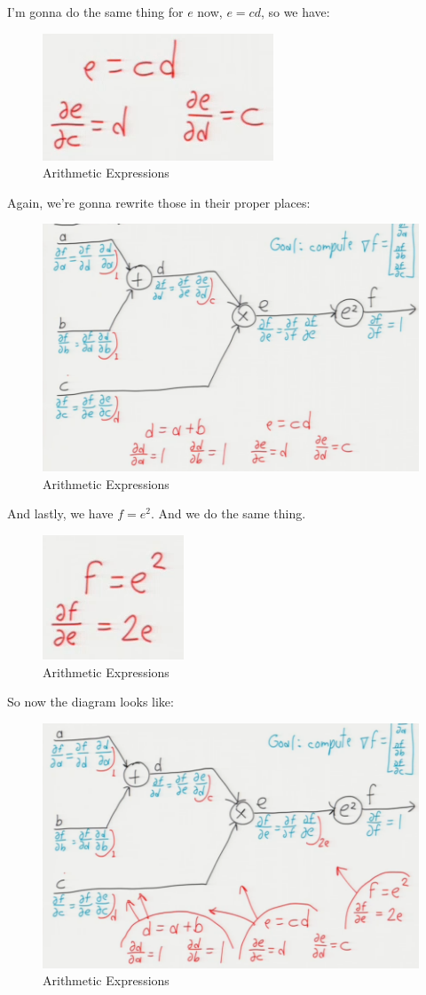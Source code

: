 \documentclass[fleqn,10pt]{olplainarticle}
\theoremstyle{definition}
\theoremstyle{remark}
\begin{document}
I'm gonna do the same thing for $e$ now, $e = cd$, so we have:
\begin{figure}[ht]
\centering
\includegraphics[width=0.2\linewidth]{images/arithmetic_expression_5}
\caption{Arithmetic Expressions}
\label{fig:arithmetic_expression_5}
\end{figure}

Again, we're gonna rewrite those in their proper places:
\begin{figure}[ht]
\centering
\includegraphics[width=0.6\linewidth]{images/arithmetic_expression_6}
\caption{Arithmetic Expressions}
\label{fig:arithmetic_expression_6}
\end{figure}
\clearpage

And lastly, we have $f = e^2$. And we do the same thing. 
\begin{figure}[ht]
\centering
\includegraphics[width=0.2\linewidth]{images/arithmetic_expression_7}
\caption{Arithmetic Expressions}
\label{fig:arithmetic_expression_7}
\end{figure}

So now the diagram looks like:
\begin{figure}[ht]
\centering
\includegraphics[width=0.6\linewidth]{images/arithmetic_expression_8}
\caption{Arithmetic Expressions}
\label{fig:arithmetic_expression_8}
\end{figure}
\end{document}
